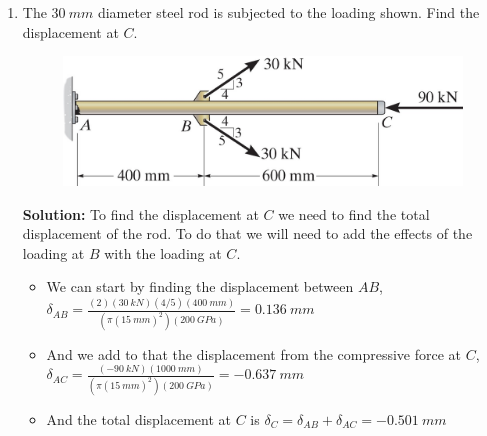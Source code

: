 \documentclass[12pt, oneside]{article}
\begin{document}
\begin{enumerate}
	\item %
		The $\SI{30}{mm}$ diameter steel rod is subjected to the loading shown.
		Find the displacement at $C$.
		\begin{figure}[H]
			\centering
			\includegraphics[width=0.8\linewidth]{f4-3}
		\end{figure}
		\textbf{Solution:} To find the displacement at $C$ we need to find the total displacement of the rod.
		To do that we will need to add the effects of the loading at $B$ with the loading at $C$.
		\begin{itemize}
			\item We can start by finding the displacement between $AB$, $\delta_{AB} = \frac{(2)(\SI{30}{kN})(4/5)(\SI{400}{mm})}{(\pi (\SI{15}{mm})^2)(\SI{200 }{GPa})} = \SI{0.136}{mm}$
			\item And we add to that the displacement from the compressive force at $C$, $\delta_{AC} = \frac{(\SI{-90}{kN})(\SI{1000}{mm})}{(\pi (\SI{15 }{mm})^2)(\SI{200}{GPa})} = \SI{-0.637}{mm}$
			\item And the total displacement at $C$ is $\delta_C = \delta_{AB} + \delta_{AC} = \SI{-0.501}{mm}$
		\end{itemize}


\end{enumerate}
\end{document}
